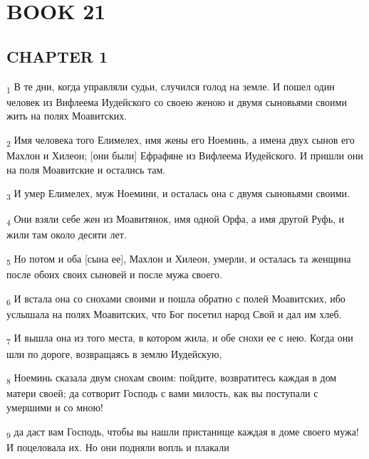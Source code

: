 \section{BOOK 21}
\subsection{CHAPTER 1}
\begin{tcolorbox}
\textsubscript{1} В те дни, когда управляли судьи, случился голод на земле. И пошел один человек из Вифлеема Иудейского со своею женою и двумя сыновьями своими жить на полях Моавитских.
\end{tcolorbox}
\begin{tcolorbox}
\textsubscript{2} Имя человека того Елимелех, имя жены его Ноеминь, а имена двух сынов его Махлон и Хилеон; [они были] Ефрафяне из Вифлеема Иудейского. И пришли они на поля Моавитские и остались там.
\end{tcolorbox}
\begin{tcolorbox}
\textsubscript{3} И умер Елимелех, муж Ноемини, и осталась она с двумя сыновьями своими.
\end{tcolorbox}
\begin{tcolorbox}
\textsubscript{4} Они взяли себе жен из Моавитянок, имя одной Орфа, а имя другой Руфь, и жили там около десяти лет.
\end{tcolorbox}
\begin{tcolorbox}
\textsubscript{5} Но потом и оба [сына ее], Махлон и Хилеон, умерли, и осталась та женщина после обоих своих сыновей и после мужа своего.
\end{tcolorbox}
\begin{tcolorbox}
\textsubscript{6} И встала она со снохами своими и пошла обратно с полей Моавитских, ибо услышала на полях Моавитских, что Бог посетил народ Свой и дал им хлеб.
\end{tcolorbox}
\begin{tcolorbox}
\textsubscript{7} И вышла она из того места, в котором жила, и обе снохи ее с нею. Когда они шли по дороге, возвращаясь в землю Иудейскую,
\end{tcolorbox}
\begin{tcolorbox}
\textsubscript{8} Ноеминь сказала двум снохам своим: пойдите, возвратитесь каждая в дом матери своей; да сотворит Господь с вами милость, как вы поступали с умершими и со мною!
\end{tcolorbox}
\begin{tcolorbox}
\textsubscript{9} да даст вам Господь, чтобы вы нашли пристанище каждая в доме своего мужа! И поцеловала их. Но они подняли вопль и плакали
\end{tcolorbox}
